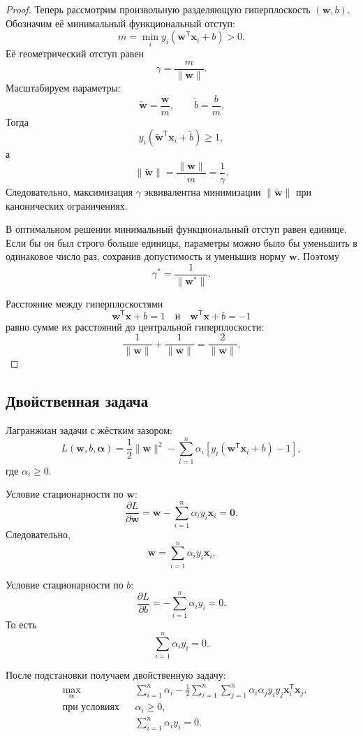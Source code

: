 \documentclass[12pt,a4paper]{article}
\theoremstyle{definition}
\newcommand{\T}{\mathsf{T}}
\newcommand{\1}{\mathbf{1}}
\begin{document}
\begin{proof}
Теперь рассмотрим произвольную разделяющую гиперплоскость
$(\bm{w},b)$. Обозначим её минимальный функциональный отступ:
\[
    m
    =
    \min_i y_i(\bm{w}^{\T}\bm{x}_i+b)>0.
\]
Её геометрический отступ равен
\[
    \gamma=\frac{m}{\|\bm{w}\|}.
\]
Масштабируем параметры:
\[
    \widetilde{\bm{w}}=\frac{\bm{w}}{m},
    \qquad
    \widetilde{b}=\frac{b}{m}.
\]
Тогда
\[
    y_i(
        \widetilde{\bm{w}}^{\T}\bm{x}_i
        +
        \widetilde{b}
    )
    \geq1,
\]
а
\[
    \|\widetilde{\bm{w}}\|
    =
    \frac{\|\bm{w}\|}{m}
    =
    \frac{1}{\gamma}.
\]
Следовательно, максимизация $\gamma$ эквивалентна минимизации
$\|\widetilde{\bm{w}}\|$ при канонических ограничениях.

В оптимальном решении минимальный функциональный отступ равен единице.
Если бы он был строго больше единицы, параметры можно было бы
уменьшить в одинаковое число раз, сохранив допустимость и уменьшив
норму $\bm{w}$. Поэтому
\[
    \gamma^{*}
    =
    \frac{1}{\|\bm{w}^{*}\|}.
\]

Расстояние между гиперплоскостями
\[
    \bm{w}^{\T}\bm{x}+b=1
    \quad\text{и}\quad
    \bm{w}^{\T}\bm{x}+b=-1
\]
равно сумме их расстояний до центральной гиперплоскости:
\[
    \frac{1}{\|\bm{w}\|}
    +
    \frac{1}{\|\bm{w}\|}
    =
    \frac{2}{\|\bm{w}\|}.
\]
\end{proof}

\subsection{Двойственная задача}

Лагранжиан задачи с жёстким зазором:
\[
    L(\bm{w},b,\bm{\alpha})
    =
    \frac{1}{2}\|\bm{w}\|^2
    -
    \sum_{i=1}^{n}
    \alpha_i
    \left[
        y_i(\bm{w}^{\T}\bm{x}_i+b)-1
    \right],
\]
где $\alpha_i\geq0$.

Условие стационарности по $\bm{w}$:
\[
    \frac{\partial L}{\partial\bm{w}}
    =
    \bm{w}
    -
    \sum_{i=1}^{n}\alpha_i y_i\bm{x}_i
    =
    \bm{0}.
\]
Следовательно,
\[
    \boxed{
    \bm{w}
    =
    \sum_{i=1}^{n}\alpha_i y_i\bm{x}_i.
    }
\]

Условие стационарности по $b$:
\[
    \frac{\partial L}{\partial b}
    =
    -
    \sum_{i=1}^{n}\alpha_i y_i
    =
    0.
\]
То есть
\[
    \boxed{
    \sum_{i=1}^{n}\alpha_i y_i=0.
    }
\]

После подстановки получаем двойственную задачу:
\[
\boxed{
\begin{aligned}
    &\max_{\bm{\alpha}}
    &&
    \sum_{i=1}^{n}\alpha_i
    -
    \frac{1}{2}
    \sum_{i=1}^{n}
    \sum_{j=1}^{n}
    \alpha_i\alpha_jy_iy_j
    \bm{x}_i^{\T}\bm{x}_j,\\
    &\text{при условиях}
    &&
    \alpha_i\geq0,\\
    &&
    &\sum_{i=1}^{n}\alpha_i y_i=0.
\end{aligned}
}
\]
\end{document}
